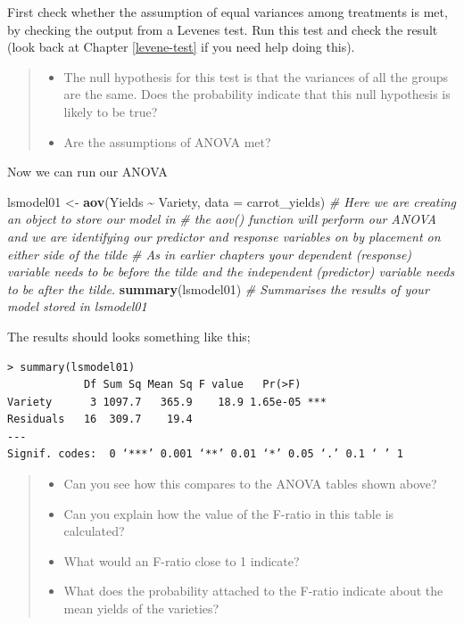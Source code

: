 \documentclass[
]{book}
\newenvironment{Shaded}{\begin{snugshade}}{\end{snugshade}}
\newcommand{\AttributeTok}[1]{\textcolor[rgb]{0.13,0.29,0.53}{#1}}
\newcommand{\CommentTok}[1]{\textcolor[rgb]{0.56,0.35,0.01}{\textit{#1}}}
\newcommand{\FunctionTok}[1]{\textcolor[rgb]{0.13,0.29,0.53}{\textbf{#1}}}
\newcommand{\NormalTok}[1]{#1}
\newcommand{\OtherTok}[1]{\textcolor[rgb]{0.56,0.35,0.01}{#1}}
\newcommand{\SpecialCharTok}[1]{\textcolor[rgb]{0.81,0.36,0.00}{\textbf{#1}}}
\providecommand{\tightlist}{%
  \setlength{\itemsep}{0pt}\setlength{\parskip}{0pt}}
\begin{document}
First check whether the assumption of equal variances among treatments is met, by checking the output from a Levenes test. Run this test and check the result (look back at Chapter \ref{levene-test} if you need help doing this).

\begin{quote}
\begin{itemize}
\tightlist
\item
  The null hypothesis for this test is that the variances of all the groups are the same. Does the probability indicate that this null hypothesis is likely to be true?
\item
  Are the assumptions of ANOVA met?
\end{itemize}
\end{quote}

Now we can run our ANOVA

\begin{Shaded}
\begin{Highlighting}[]
\NormalTok{lsmodel01 }\OtherTok{\textless{}{-}} \FunctionTok{aov}\NormalTok{(Yields }\SpecialCharTok{\textasciitilde{}}\NormalTok{ Variety, }\AttributeTok{data =}\NormalTok{ carrot\_yields)}
\CommentTok{\# Here we are creating an object to store our model in }
\CommentTok{\# the aov() function will perform our ANOVA and we are identifying our predictor and response variables on by placement on either side of the tilde }
\CommentTok{\# As in earlier chapters your dependent (response) variable needs to be before the tilde and the independent (predictor) variable needs to be after the tilde.}
\FunctionTok{summary}\NormalTok{(lsmodel01)}
\CommentTok{\# Summarises the results of your model stored in lsmodel01}
\end{Highlighting}
\end{Shaded}

The results should looks something like this;

\begin{verbatim}
> summary(lsmodel01)
            Df Sum Sq Mean Sq F value   Pr(>F)    
Variety      3 1097.7   365.9    18.9 1.65e-05 ***
Residuals   16  309.7    19.4                     
---
Signif. codes:  0 ‘***’ 0.001 ‘**’ 0.01 ‘*’ 0.05 ‘.’ 0.1 ‘ ’ 1
\end{verbatim}

\begin{quote}
\begin{itemize}
\tightlist
\item
  Can you see how this compares to the ANOVA tables shown above?
\item
  Can you explain how the value of the F-ratio in this table is calculated?
\item
  What would an F-ratio close to 1 indicate?
\item
  What does the probability attached to the F-ratio indicate about the mean yields of the varieties?
\end{itemize}
\end{quote}
\end{document}
